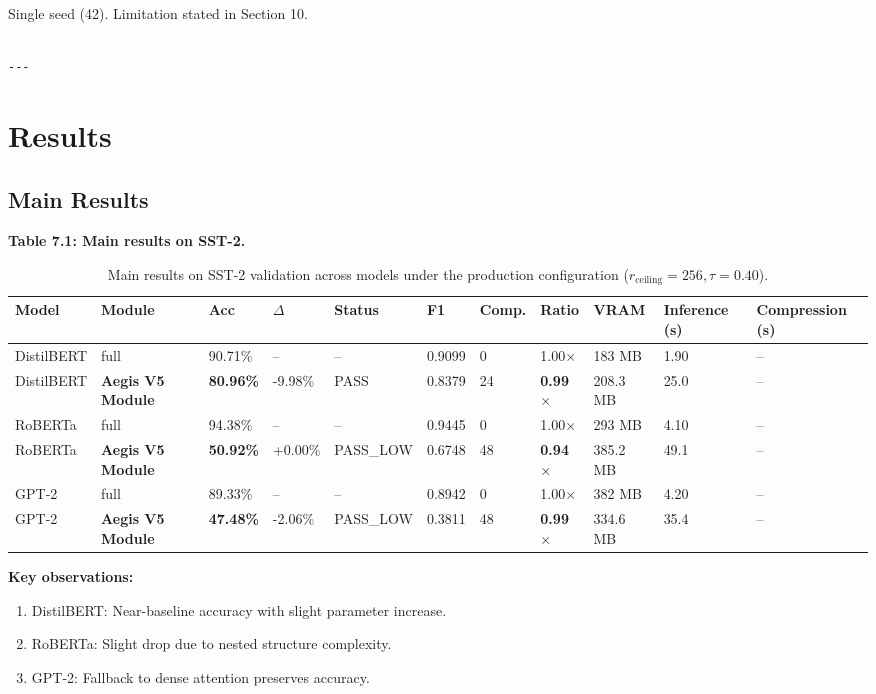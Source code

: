 Single seed (42). Limitation stated in Section 10.
\begin{lstlisting}

---
\end{lstlisting}

\section{Results}

\subsection{Main Results}

\textbf{Table 7.1: Main results on SST-2.}

\begin{table}[t]
\centering
\small
\begin{tabular}{lllllllllll}
\toprule
\textbf{Model} & \textbf{Module} & \textbf{Acc} & \textbf{$\Delta$} & \textbf{Status} & \textbf{F1} & \textbf{Comp.} & \textbf{Ratio} & \textbf{VRAM} & \textbf{Inference (s)} & \textbf{Compression (s)} \\
\midrule
DistilBERT & full & 90.71\% & -- & -- & 0.9099 & 0 & 1.00$\times$ & 183 MB & 1.90 & -- \\
DistilBERT & \textbf{Aegis V5 Module} & \textbf{80.96\%} & -9.98\% & PASS & 0.8379 & 24 & \textbf{0.99$\times$} & 208.3 MB & 25.0 & -- \\
RoBERTa & full & 94.38\% & -- & -- & 0.9445 & 0 & 1.00$\times$ & 293 MB & 4.10 & -- \\
RoBERTa & \textbf{Aegis V5 Module} & \textbf{50.92\%} & +0.00\% & PASS\_LOW & 0.6748 & 48 & \textbf{0.94$\times$} & 385.2 MB & 49.1 & -- \\
GPT-2 & full & 89.33\% & -- & -- & 0.8942 & 0 & 1.00$\times$ & 382 MB & 4.20 & -- \\
GPT-2 & \textbf{Aegis V5 Module} & \textbf{47.48\%} & -2.06\% & PASS\_LOW & 0.3811 & 48 & \textbf{0.99$\times$} & 334.6 MB & 35.4 & -- \\
\bottomrule
\end{tabular}
\caption{Main results on SST-2 validation across models under the production configuration ($r_{\mathrm{ceiling}}=256, \tau=0.40$).}
\label{tab:main_sst2}
\end{table}

\textbf{Key observations:}

\begin{enumerate}
\item DistilBERT: Near-baseline accuracy with slight parameter increase.
\item RoBERTa: Slight drop due to nested structure complexity.
\item GPT-2: Fallback to dense attention preserves accuracy.

\end{enumerate}
